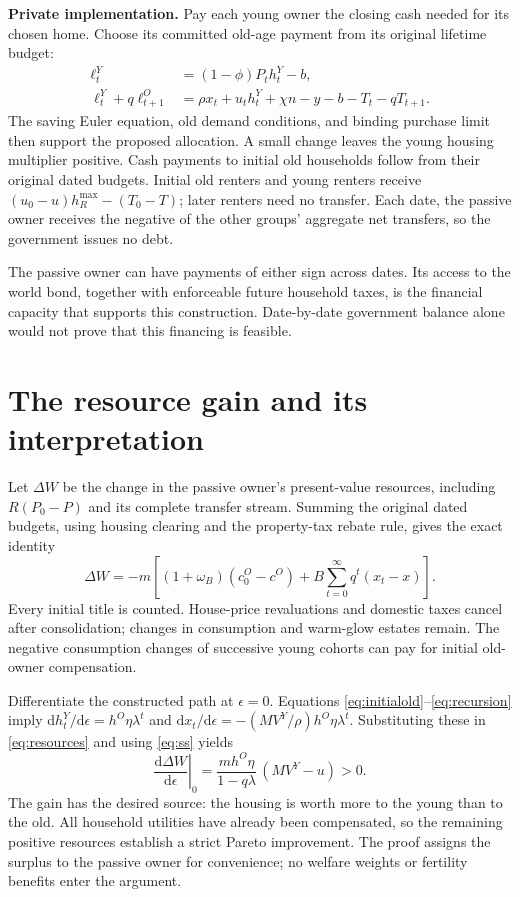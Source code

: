 \documentclass[11pt]{article}
\begin{document}
\textbf{Private implementation.} Pay each young owner the closing cash needed
for its chosen home. Choose its committed old-age payment from its original
lifetime budget:
\begin{align}
 \ell_t^Y&=(1-\phi)P_t h_t^Y-b,\label{eq:younggrant}\\
 \ell_t^Y+q\ell_{t+1}^O
 &=\rho x_t+u_t h_t^Y+\chi n-y-b-T_t-qT_{t+1}.
 \label{eq:lifetimegrant}
\end{align}
The saving Euler equation, old demand conditions, and binding purchase limit
then support the proposed allocation. A small change leaves the young
housing multiplier positive. Cash payments to initial old households follow
from their original dated budgets. Initial old renters and young renters
receive $(u_0-u)h_R^{\max}-(T_0-T)$; later renters need no transfer. Each date,
the passive owner receives the negative of the other groups' aggregate net
transfers, so the government issues no debt.

The passive owner can have payments of either sign across dates. Its access to
the world bond, together with enforceable future household taxes, is the
financial capacity that supports this construction. Date-by-date government
balance alone would not prove that this financing is feasible.

\section{The resource gain and its interpretation}

Let $\Delta W$ be the change in the passive owner's present-value resources,
including $R(P_0-P)$ and its complete transfer stream. Summing the original
dated budgets, using housing clearing and the property-tax rebate rule, gives
the exact identity
\begin{equation}
 \Delta W=-m\left[(1+\omega_B)(c_0^O-c^O)
       +B\sum_{t=0}^{\infty}q^t(x_t-x)\right].
 \label{eq:resources}
\end{equation}
Every initial title is counted. House-price revaluations and domestic taxes
cancel after consolidation; changes in consumption and warm-glow estates
remain. The negative consumption changes of successive young cohorts can
pay for initial old-owner compensation.

Differentiate the constructed path at $\epsilon=0$. Equations
\eqref{eq:initialold}--\eqref{eq:recursion} imply
$\mathrm dh_t^Y/\mathrm d\epsilon=h^O\eta\lambda^t$ and
$\mathrm dx_t/\mathrm d\epsilon=-(MV^Y/\rho)h^O\eta\lambda^t$.
Substituting these in \eqref{eq:resources} and using \eqref{eq:ss} yields
\begin{equation}
 \left.\frac{\mathrm d\Delta W}{\mathrm d\epsilon}\right|_{0}
 =\frac{m h^O\eta}{1-q\lambda}\,(MV^Y-u)>0.
 \label{eq:gain}
\end{equation}
The gain has the desired source: the housing is worth more to the young than
to the old. All household utilities have already been compensated, so the
remaining positive resources establish a strict Pareto improvement. The proof
assigns the surplus to the passive owner for convenience; no welfare weights
or fertility benefits enter the argument.
\end{document}

